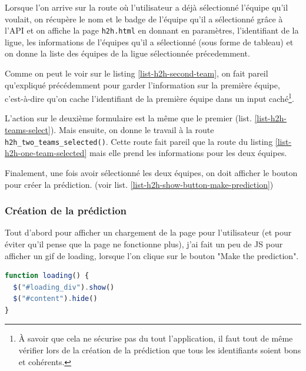 \documentclass[a4paper,14pt]{extarticle}
\begin{document}
{

Lorsque l'on arrive sur la route où l'utilisateur a déjà sélectionné l'équipe qu'il voulait, on récupère le nom et le badge de l'équipe qu'il a sélectionné grâce à l'API et on affiche la page \texttt{h2h.html} en donnant en paramètres, l'identifiant de la ligue, les informations de l'équipes qu'il a sélectionné (sous forme de tableau) et on donne la liste des équipes de la ligue sélectionnée précedemment.


Comme on peut le voir sur le listing \ref{list-h2h-second-team}, on fait pareil qu'expliqué précédemment pour garder l'information sur la première équipe, c'est-à-dire qu'on cache l'identifiant de la première équipe dans un input caché\footnote{À savoir que cela ne sécurise pas du tout l'application, il faut tout de même vérifier lors de la création de la prédiction que tous les identifiants soient bons et cohérents.}.

L'action sur le deuxième formulaire est la même que le premier (list. \ref{list-h2h-teams-select}). Mais ensuite, on donne le travail à la route \texttt{h2h\_two\_teams\_selected()}. Cette route fait pareil que la route du listing \ref{list-h2h-one-team-selected} mais elle prend les informations pour les deux équipes.


Finalement, une fois avoir sélectionné les deux équipes, on doit afficher le bouton pour créer la prédiction. (voir list. \ref{list-h2h-show-button-make-prediction})


\subsubsection{Création de la prédiction}

Tout d'abord pour afficher un chargement de la page pour l'utilisateur (et pour éviter qu'il pense que la page ne fonctionne plus), j'ai fait un peu de JS pour afficher un gif de loading, lorsque l'on clique sur le bouton "Make the prediction". 

\begin{lstlisting}[language=JavaScript, firstnumber=1, caption=Affichage du loading lors de la création de la prédiction, captionpos=b, label=jsLoading]
function loading() {
  $("#loading_div").show()
  $("#content").hide()
}
\end{lstlisting}

}
\end{document}
